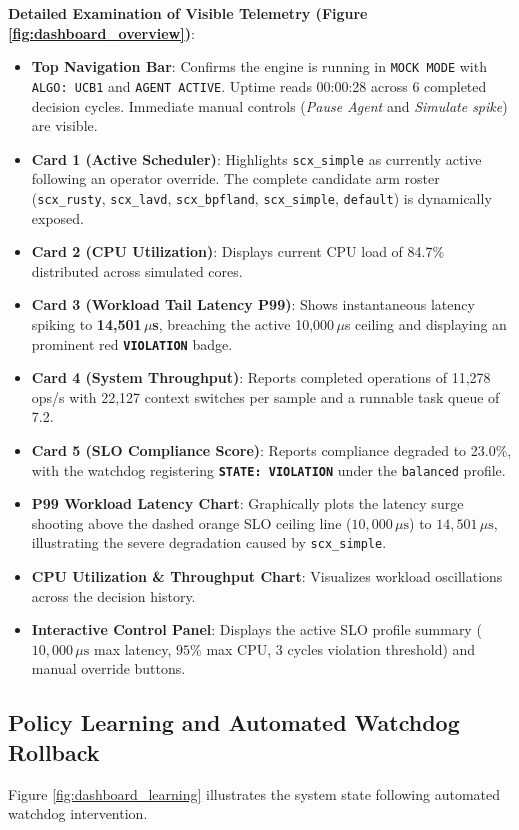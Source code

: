 \documentclass[journal]{IEEEtran}
\begin{document}
\textbf{Detailed Examination of Visible Telemetry (Figure \ref{fig:dashboard_overview})}:
\begin{itemize}
    \item \textbf{Top Navigation Bar}: Confirms the engine is running in \texttt{MOCK MODE} with \texttt{ALGO: UCB1} and \texttt{AGENT ACTIVE}. Uptime reads 00:00:28 across 6 completed decision cycles. Immediate manual controls (\textit{Pause Agent} and \textit{Simulate spike}) are visible.
    \item \textbf{Card 1 (Active Scheduler)}: Highlights \texttt{scx\_simple} as currently active following an operator override. The complete candidate arm roster (\texttt{scx\_rusty}, \texttt{scx\_lavd}, \texttt{scx\_bpfland}, \texttt{scx\_simple}, \texttt{default}) is dynamically exposed.
    \item \textbf{Card 2 (CPU Utilization)}: Displays current CPU load of 84.7\% distributed across simulated cores.
    \item \textbf{Card 3 (Workload Tail Latency P99)}: Shows instantaneous latency spiking to \textbf{14,501\,$\mu$s}, breaching the active 10,000\,$\mu$s ceiling and displaying an prominent red \textbf{\texttt{VIOLATION}} badge.
    \item \textbf{Card 4 (System Throughput)}: Reports completed operations of 11,278\,ops/s with 22,127 context switches per sample and a runnable task queue of 7.2.
    \item \textbf{Card 5 (SLO Compliance Score)}: Reports compliance degraded to 23.0\%, with the watchdog registering \textbf{\texttt{STATE: VIOLATION}} under the \texttt{balanced} profile.
    \item \textbf{P99 Workload Latency Chart}: Graphically plots the latency surge shooting above the dashed orange SLO ceiling line ($10,000\,\mu\text{s}$) to $14,501\,\mu\text{s}$, illustrating the severe degradation caused by \texttt{scx\_simple}.
    \item \textbf{CPU Utilization \& Throughput Chart}: Visualizes workload oscillations across the decision history.
    \item \textbf{Interactive Control Panel}: Displays the active SLO profile summary ($10,000\,\mu\text{s}$ max latency, $95\%$ max CPU, 3 cycles violation threshold) and manual override buttons.
\end{itemize}

\subsection{Policy Learning and Automated Watchdog Rollback}
Figure \ref{fig:dashboard_learning} illustrates the system state following automated watchdog intervention.
\end{document}
